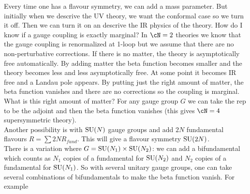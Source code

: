 Every time one has a flavour symmetry, we can add a mass parameter. But initially when we descrive the UV theory, we want the conformal case so we turn it off. Then we can turn it on an descrive the IR physics of the theory. How do I know if a gauge coupling is exactly marginal? In $\cN=2$ theories we know that the gauge coupling is renormalized at 1-loop but we assume that there are no non-perturbative corrections. If there is no matter, the theory is asymptotically free automatically. By adding matter the beta function becomes smaller and the theory becomes less and less asymptotically free. At some point it becomes IR free and a Landau pole appears. By putting just the right amount of matter, the beta function vanishes and there are no corrections so the coupling is marginal. What is this right amount of matter? For any gauge group $G$ we can take the rep to be the adjoint and then the beta function vanishes (this gives $\cN=4$ supersymmetric theory).\\
Another possibility is with $\mathrm{SU}(N)$ gauge groups and add $2N$ fundamental flavours $R=\sum 2N R_{fund}$. This will give a flavour symmetry $\mathrm{SU}(2N)$.\\
There is a variation where $G=\mathrm{SU}(N_{1})\times \mathrm{SU}(N_{2})$: we can add a bifundamental which counts as $N_{1}$ copies of a fundamental for $\mathrm{SU}(N_{2})$ and $N_{2}$ copies of a fundamental for $\mathrm{SU}(N_{1})$. So with several unitary gauge groups, one can take several combinations of bifundamentals to make the beta function vanish. For example

